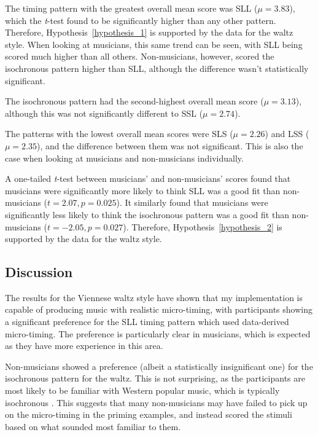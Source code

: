\documentclass[12pt,twoside,openright]{report}
\begin{document}
The timing pattern with the greatest overall mean score was SLL ($\mu=3.83$), which
the \textit{t}-test found to be significantly higher than any other pattern. Therefore,
Hypothesis~\ref{hypothesis_1} is supported by the data for the waltz style. When looking
at musicians, this same trend can be seen, with SLL being scored much higher
than all others. Non-musicians, however, scored the isochronous pattern higher
than SLL, although the difference wasn't statistically significant.

The isochronous pattern had the second-highest overall mean score ($\mu=3.13$),
although this was not significantly different to SSL ($\mu=2.74$).

The patterns with the lowest overall mean scores were SLS ($\mu=2.26$) and LSS ($\mu=2.
35$), and the difference between them was not significant. This is also the case
when looking at musicians and non-musicians individually.

A one-tailed \textit{t}-test between musicians' and non-musicians' scores found that
musicians were significantly more likely to think SLL was a good fit than
non-musicians ($t=2.07, p=0.025$). It similarly found that musicians were
significantly less likely to think the isochronous pattern was a good fit than
non-musicians ($t=-2.05, p=0.027$). Therefore, Hypothesis~\ref{hypothesis_2} is supported by the
data for the waltz style.


\subsection{Discussion} \label{user_study_discussion}

The results for the Viennese waltz style have shown that my implementation is
capable of producing music with realistic micro-timing, with participants
showing a significant preference for the SLL timing pattern which used
data-derived micro-timing. The preference is particularly clear in musicians,
which is expected as they have more experience in this area.

Non-musicians showed a preference (albeit a statistically insignificant one) for the
isochronous pattern for the waltz. This is not surprising, as the participants
are most likely to be familiar with Western popular music, which is typically
isochronous \cite{soley2010}. This suggests that many non-musicians may have failed to pick up on
the micro-timing in the priming examples, and instead scored the stimuli based
on what sounded most familiar to them.
\end{document}
